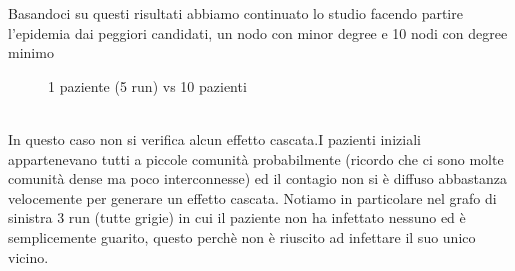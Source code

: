 \documentclass[a4paper]{article}
\begin{document}
Basandoci su questi risultati abbiamo continuato lo studio facendo partire l'epidemia dai peggiori candidati, un nodo con minor degree e 10 nodi con degree minimo\\
\begin{figure}[!ht]
\centering
{}
\caption{1 paziente (5 run) vs 10 pazienti} \label{FIG:bad_diffusion}
\end{figure}\\
In questo caso non si verifica alcun effetto cascata.I pazienti iniziali appartenevano tutti a piccole comunità probabilmente (ricordo che ci sono molte comunità dense ma poco interconnesse) ed il contagio non si è diffuso abbastanza velocemente per generare un effetto cascata. Notiamo in particolare nel grafo di sinistra 3 run (tutte grigie) in cui il paziente non ha infettato nessuno ed è semplicemente guarito, questo perchè non è riuscito ad infettare il suo unico vicino.
\end{document}
